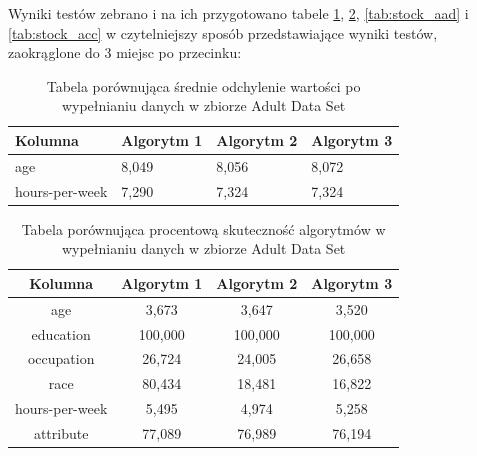 \documentclass[12pt,twoside]{article}
\begin{document}
Wyniki testów zebrano i na ich przygotowano tabele \ref{tab:adult_aad}, \ref{tab:adult_acc},
\ref{tab:stock_aad} i \ref{tab:stock_acc} w czytelniejszy sposób przedstawiające wyniki testów, zaokrąglone do 3 miejsc po przecinku:

\begin{table}[ht]
    \caption{Tabela porównująca średnie odchylenie wartości po wypełnianiu danych w zbiorze Adult Data Set}
    \centering
    \begin{tabular}{|l|l|l|l|}
        \hline
        \textbf{Kolumna} & \textbf{Algorytm 1} & \textbf{Algorytm 2} & \textbf{Algorytm 3} \\ \hline
        age              & 8,049               & 8,056               & 8,072               \\ \hline
        hours-per-week   & 7,290               & 7,324               & 7,324               \\ \hline
    \end{tabular}
    \label{tab:adult_aad}
\end{table}
\FloatBarrier

\begin{table}[ht]
    \caption{Tabela porównująca procentową skuteczność algorytmów w wypełnianiu danych w zbiorze Adult Data Set}
    \centering
    \begin{tabular}{|c|c|c|c|}
        \hline
        \textbf{Kolumna} & \textbf{Algorytm 1} & \textbf{Algorytm 2} & \textbf{Algorytm 3} \\ \hline
        age              & 3,673               & 3,647               & 3,520               \\ \hline
        education        & 100,000             & 100,000             & 100,000             \\ \hline
        occupation       & 26,724              & 24,005              & 26,658              \\ \hline
        race             & 80,434              & 18,481              & 16,822              \\ \hline
        hours-per-week   & 5,495               & 4,974               & 5,258               \\ \hline
        attribute        & 77,089              & 76,989              & 76,194              \\ \hline
    \end{tabular}
    \label{tab:adult_acc}
\end{table}
\FloatBarrier
\end{document}
